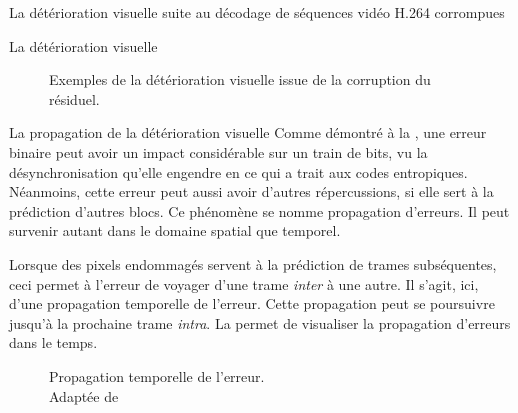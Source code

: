 \begin{chapter}{La détérioration visuelle suite au décodage de séquences vidéo H.264 corrompues}
\begin{section}{La détérioration visuelle}
\begin{figure}
	\caption[Détérioration visuelle issue de la corruption du résiduel]{Exemples de
la détérioration visuelle issue de la corruption du résiduel.}
	\label{fig-ResBad}
\end{figure}

\end{section}

\begin{section}{La propagation de la détérioration visuelle}
\label{sect-propagation}
Comme démontré à la  , une erreur
binaire peut avoir un impact considérable sur un train de bits, vu la
désynchronisation qu'elle engendre en ce qui a trait aux codes entropiques.
Néanmoins, cette erreur peut aussi avoir d'autres répercussions, si elle sert à
la prédiction d'autres blocs. Ce phénomène se nomme propagation d'erreurs. Il
peut survenir autant dans le domaine spatial que temporel.

Lorsque des pixels endommagés servent à la prédiction de trames subséquentes,
ceci permet à l'erreur de voyager d'une trame \textit{inter} à une autre. Il
s'agit, ici, d'une propagation temporelle de l'erreur. Cette propagation peut se
poursuivre jusqu'à la prochaine trame \textit{intra}. La 
permet de visualiser la propagation d'erreurs dans le temps.

\begin{figure}
	\caption[Propagation temporelle de l'erreur] {Propagation temporelle de
l'erreur.\\ Adaptée de \citet[p.~1711]{Giro1999}}
	\label{fig-ErrorProp}
\end{figure}


\end{section}
\end{chapter}
